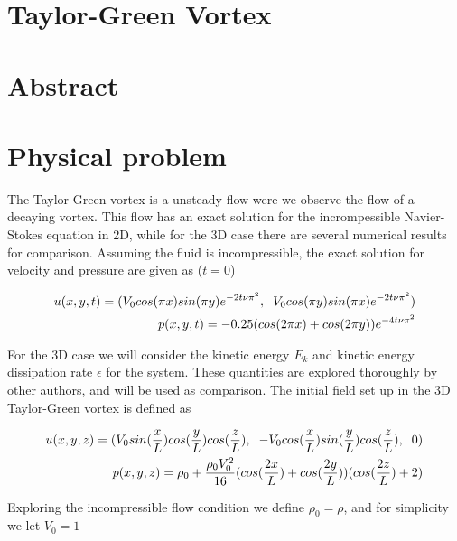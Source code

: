 \documentclass[a4paper,norsk]{article}
\begin{document}
\maketitle
\section*{Taylor-Green Vortex}

\section*{Abstract}

\section*{Physical problem}
The Taylor-Green vortex is a unsteady flow were we observe the flow of a decaying
vortex. This flow has an exact solution for the incrompessible Navier-Stokes equation in 2D, while for the 3D
case there are several numerical results for comparison.
Assuming the fluid is incompressible, the exact solution for velocity and pressure are given as ($t=0$)

\begin{align}
u(x,y,t) = (V_{0} cos(\pi x)sin(\pi y) e^{-2 t \nu \pi^{2} }, \hspace{2mm} V_{0}cos(\pi y)sin(\pi x) e^{-2 t \nu \pi^2} ) \\
p(x,y,t) = -0.25(cos(2\pi x) + cos(2 \pi y) ) e^{-4 t \nu \pi^2}
\end{align}


For the 3D case we will consider the kinetic energy $E_k$ and kinetic energy dissipation rate $\epsilon$  for the system. These quantities are
explored thoroughly by other authors, and will be used as comparison. The initial field set up in the 3D Taylor-Green vortex is defined as

\begin{align}
u(x,y,z) = ( V_{0}sin(\frac{x}{L}) cos(\frac{y}{L}) cos(\frac{z}{L}), \hspace{2mm}-V_{0}cos(\frac{x}{L})sin(\frac{y}{L})cos(\frac{z}{L}), \hspace{2mm} 0 )\\
p(x,y,z) = \rho_{0} + \frac{\rho_0 V_0^2}{16}(cos(\frac{2x}{L}) + cos(\frac{2y}{L}))(cos(\frac{2z}{L}) + 2)
\end{align}

Exploring the incompressible flow condition we define $\rho_0 = \rho$, and for simplicity we let $V_0 = 1$
\end{document}
